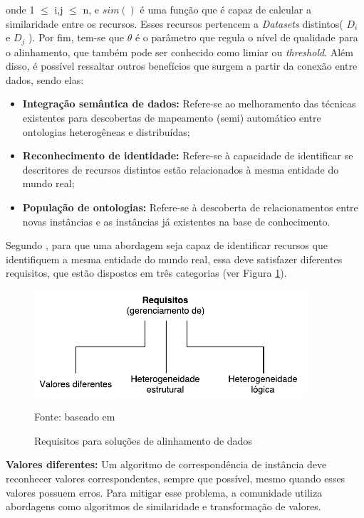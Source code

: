 onde 1 $\leq$ i,j $\leq$ n, e $sim()$ é uma função que é capaz de calcular a similaridade entre os recursos. Esses recursos pertencem a \textit{Datasets} distintos( ${ D }_{ i }$ e ${ D }_{ j }$ ). Por fim, tem-se que $\theta$ é o parâmetro que regula o nível de qualidade para o alinhamento, que também pode ser conhecido como limiar ou \textit{threshold}. Além disso, é possível ressaltar outros benefícios que surgem a partir da conexão entre dados, sendo elas: 

\begin{itemize}
	\item \textbf{Integração semântica de dados:} Refere-se ao melhoramento das técnicas existentes para descobertas de mapeamento (semi) automático entre ontologias heterogêneas e distribuídas; 
	\item \textbf{Reconhecimento de identidade:} Refere-se à capacidade de identificar se descritores de recursos distintos estão relacionados à mesma entidade do mundo real; 
	\item\textbf{ População de ontologias:} Refere-se à descoberta de relacionamentos entre novas instâncias e as instâncias já existentes na base de conhecimento. 
\end{itemize}

Segundo , para que uma abordagem seja capaz de identificar recursos que identifiquem a mesma entidade do mundo real, essa deve satisfazer diferentes requisitos, que estão  dispostos em três categorias (ver Figura \ref{fig:imrequirements}).

\begin{figure}[!ht]
	\centering
	\includegraphics[width=0.9\textwidth]{./imagens/im_requirements.pdf}
    \caption{Requisitos para soluções de alinhamento de dados}
	\footnotesize{Fonte: baseado em \cite{ferrara2008towards}}
	\label{fig:imrequirements}
\end{figure}

\textbf{Valores diferentes:}
% 
% 
%
%
Um algoritmo de correspondência de instância deve reconhecer valores correspondentes, sempre que possível, mesmo quando esses valores possuem erros. Para mitigar esse problema, a comunidade utiliza abordagens como algoritmos de similaridade e transformação de valores.


